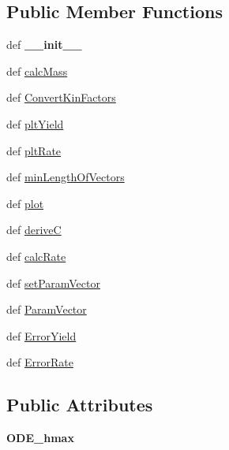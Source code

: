 \subsection*{\-Public \-Member \-Functions}
\begin{DoxyCompactItemize}
\item 
\hypertarget{classFit__one__run_1_1ArrheniusModel_ac9a94d1c646a3f830eabced4d3a07ce0}{def {\bfseries \-\_\-\-\_\-init\-\_\-\-\_\-}}\label{classFit__one__run_1_1ArrheniusModel_ac9a94d1c646a3f830eabced4d3a07ce0}

\item 
def \hyperlink{classFit__one__run_1_1ArrheniusModel_aef95e08280a5f8628b63ea1300227aa7}{calc\-Mass}
\item 
def \hyperlink{classFit__one__run_1_1ArrheniusModel_a2d145de8ceef61b26b3ab701618ebb9d}{\-Convert\-Kin\-Factors}
\item 
def \hyperlink{classFit__one__run_1_1Model_aa304b32155938a713c33f0dc03a135f3}{plt\-Yield}
\item 
def \hyperlink{classFit__one__run_1_1Model_a9c28d95902adf00f5aaa642f0919fc61}{plt\-Rate}
\item 
def \hyperlink{classFit__one__run_1_1Model_a26fc879ca33c9171ebb4a97bc4b0c46b}{min\-Length\-Of\-Vectors}
\item 
def \hyperlink{classFit__one__run_1_1Model_a98159c954f1f1be2a34be3ea53d11493}{plot}
\item 
def \hyperlink{classFit__one__run_1_1Model_ace9df4177c5ae753dbe190e2f8268149}{derive\-C}
\item 
def \hyperlink{classFit__one__run_1_1Model_a07ae4534de2a6ef241d71facdffb227e}{calc\-Rate}
\item 
def \hyperlink{classFit__one__run_1_1Model_a174aec9b05dbe01ec103f7ba75d6516c}{set\-Param\-Vector}
\item 
def \hyperlink{classFit__one__run_1_1Model_a3c9239f0ac062fdae0bda395636c0372}{\-Param\-Vector}
\item 
def \hyperlink{classFit__one__run_1_1Model_aa2bc4ba19704350fb2ff441734b51b10}{\-Error\-Yield}
\item 
def \hyperlink{classFit__one__run_1_1Model_aad63c345c343f0c7d1cf20135dc0a0e5}{\-Error\-Rate}
\end{DoxyCompactItemize}
\subsection*{\-Public \-Attributes}
\begin{DoxyCompactItemize}
\item 
\hypertarget{classFit__one__run_1_1ArrheniusModel_aed77ff30b973e7ff77113c19c4ba78fa}{{\bfseries \-O\-D\-E\-\_\-hmax}}\label{classFit__one__run_1_1ArrheniusModel_aed77ff30b973e7ff77113c19c4ba78fa}

\end{DoxyCompactItemize}


